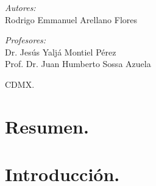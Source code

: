 \documentclass[10pt]{article}
\begin{document}
\begin{center}
\begin{minipage}{0.46\textwidth}
\begin{flushleft}
\emph{Autores:}\\	
Rodrigo Emmanuel Arellano Flores
\end{flushleft}																		%
\end{minipage}		
\begin{minipage}{0.52\textwidth}		
\vspace{-0.6cm}											%
\begin{flushright} \large															%
\emph{Profesores:} \\	
Dr. Jesús Yaljá Montiel Pérez\\																%
Prof. Dr. Juan Humberto Sossa Azuela\\
\end{flushright}																	%
\end{minipage}	
\vspace*{1cm}
 	
\vspace{2cm} 																				
\begin{center}	
CDMX. \\
 			\end{center}												  						
\end{center}							 											
																					
\newpage																		

\tableofcontents 

\newpage

\section{Resumen.}
\section{Introducción.} 
\end{document}
